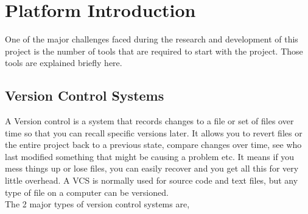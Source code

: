 \chapter{Platform Introduction}

One of the major challenges faced during the research and development
of this project is the number of tools that are required to start with
the project. Those tools are explained briefly here.

\section{Version Control Systems}

A Version control is a system that records changes to a file or set of
files over time so that you can recall specific versions later. It
allows you to revert files or the entire project back to a previous
state, compare changes over time, see who last modified something that
might be causing a problem etc. It means if you mess things up or lose
files, you can easily recover and you get all this for very little
overhead. A VCS is normally used for source code and
text files, but any type of file on a computer can be versioned. \\


The 2 major types of version control systems are,

